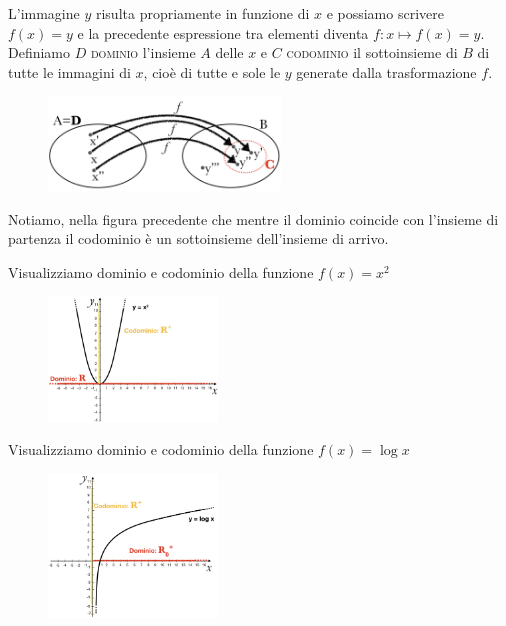 L'immagine $y$ risulta propriamente in funzione di $x$ e possiamo scrivere 
$f(x)=y$ e la precedente espressione tra elementi diventa $f: x\mapsto 
f(x)=y$.\\

Definiamo $D$ \textsc{dominio} l'insieme $A$ delle $x$ e $C$ 
\textsc{codominio} il sottoinsieme di $B$ di tutte le immagini di $x$, cioè 
di tutte e sole le $y$ generate dalla trasformazione $f$.\\

\begin{figure}[htpb!]
  \centering
  \includegraphics[width=0.55\textwidth]{img/2_funz.png}
\end{figure}
%
Notiamo, nella figura precedente che mentre il dominio coincide con l'insieme 
di partenza il codominio è un sottoinsieme dell'insieme di arrivo.\\

%
%
%
\begin{esempio}
  Visualizziamo dominio e codominio della funzione $f(x)=x^2$
  \begin{figure}[htpb!]
  \centering
  \includegraphics[width=0.4\textwidth]{img/2a_funz.png}
  \end{figure}
\end{esempio}

\begin{esempio}
  Visualizziamo dominio e codominio della funzione $f(x)=\log{x}$
  \begin{figure}[htpb!]
  \centering
  \includegraphics[width=0.4\textwidth]{img/2b_funz.png}
  \end{figure}
\end{esempio}

